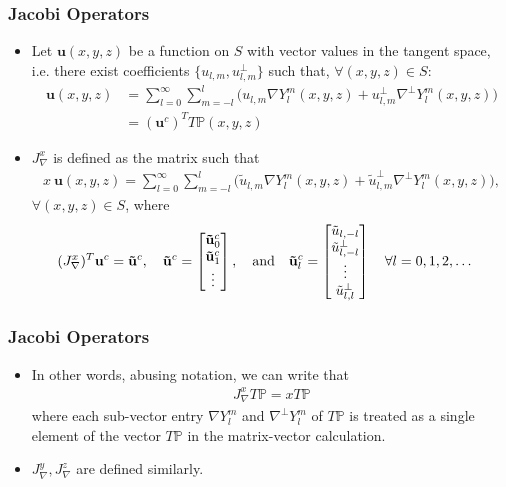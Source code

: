 \documentclass[10pt]{beamer}
\newcommand{\gradP}{T\mathbb{P}}
\newcommand{\gradYlm}{\nabla Y^m_l}
\newcommand{\gradpYlm}{\nabla^\perp Y^m_l}
\begin{document}
\frame
{
    \frametitle{Jacobi Operators}

\begin{itemize}

\item Let $\mathbf{u}(x,y,z)$ be a function on $S$ with vector values in the tangent space, i.e. there exist coefficients $\{u_{l,m}, u^\perp_{l,m}\}$ such that, $\forall (x,y,z) \in S$:
\begin{align}
\mathbf{u}(x,y,z) &= \sum_{l=0}^\infty \sum_{m=-l}^l \big( u_{l,m} \gradYlm(x,y,z) + u^\perp_{l,m} \gradpYlm(x,y,z) \big) \\
&= (\mathbf{u}^c)^T \gradP(x,y,z)
\end{align}

\item \(J_\nabla^x\) is defined as the matrix such that 
\begin{align}
x \: \mathbf{u}(x,y,z) = \sum_{l=0}^\infty \sum_{m=-l}^l \big( \tilde{u}_{l,m} \gradYlm(x,y,z) + \tilde{u}^\perp_{l,m} \gradpYlm(x,y,z) \big),
\end{align}
$\forall (x,y,z) \in S$, where
\begin{align}
(J_\nabla^x)^T \mathbf{u}^c = \mathbf{\tilde{u}}^c,
\quad
\bold{\tilde{u}}^c = \begin{bmatrix}
			\bold{\tilde{u}}_0^c \\
			\bold{\tilde{u}}_1^c \\
			\vdots \\
		    \end{bmatrix},		  
\quad
\text{and}
\quad
\bold{\tilde{u}}^c_l &= \begin{bmatrix}
				\tilde{u}_{l,-l} \\
				\tilde{u}^{\perp}_{l,-l} \\
				\vdots \\
				\tilde{u}^{\perp}_{l,l}
		        \end{bmatrix} \quad \forall l = 0,1,2,\dots
\end{align}

\end{itemize}

}

\frame
{
    \frametitle{Jacobi Operators}
    
\begin{itemize}

\item In other words, abusing notation, we can write that
\begin{align}
J_\nabla^x \gradP = x \gradP
\end{align}
where each sub-vector entry \(\gradYlm\) and \(\gradpYlm\) of \(\gradP\) is treated as a single element of the vector \(\gradP\) in the matrix-vector calculation.

\item \(J_\nabla^y, J_\nabla^z\) are defined similarly.

\end{itemize}

}
\end{document}
